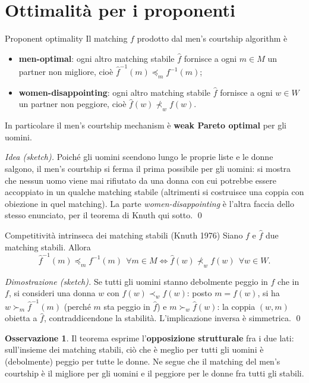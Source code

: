 \documentclass[12pt,a4paper,twoside]{book}
\theoremstyle{plain}
\theoremstyle{definition}
\newtheorem{remark}[theorem]{Osservazione}
\begin{document}
\section{Ottimalità per i proponenti}

\begin{thmbox}{Proponent optimality}
Il matching $f$ prodotto dal men's courtship algorithm è
\begin{itemize}
  \item \textbf{men-optimal}: ogni altro matching stabile $\hat f$ fornisce a ogni $m\in M$ un partner non migliore, cioè $\hat f^{-1}(m)\preceq_m f^{-1}(m)$;
  \item \textbf{women-disappointing}: ogni altro matching stabile $\hat f$ fornisce a ogni $w\in W$ un partner non peggiore, cioè $\hat f(w)\not\prec_w f(w)$.
\end{itemize}
In particolare il men's courtship mechanism è \textbf{weak Pareto optimal} per gli uomini.
\end{thmbox}

\textit{Idea (sketch).} Poiché gli uomini scendono lungo le proprie liste e le donne salgono, il men's courtship si ferma il prima possibile per gli uomini: si mostra che nessun uomo viene mai rifiutato da una donna con cui potrebbe essere accoppiato in un qualche matching stabile (altrimenti si costruisce una coppia con obiezione in quel matching). La parte \emph{women-disappointing} è l'altra faccia dello stesso enunciato, per il teorema di Knuth qui sotto. \qed

\begin{thmbox}{Competitività intrinseca dei matching stabili (Knuth 1976)}
Siano $f$ e $\hat f$ due matching stabili. Allora
\[ \hat f^{-1}(m)\preceq_m f^{-1}(m)\ \ \forall m\in M \iff \hat f(w)\not\prec_w f(w)\ \ \forall w\in W. \]
\end{thmbox}

\textit{Dimostrazione (sketch).} Se tutti gli uomini stanno debolmente peggio in $\hat f$ che in $f$, si consideri una donna $w$ con $\hat f(w)\prec_w f(w)$: posto $m=f(w)$, si ha $w\succ_m \hat f^{-1}(m)$ (perché $m$ sta peggio in $\hat f$) e $m\succ_w \hat f(w)$: la coppia $(w,m)$ obietta a $\hat f$, contraddicendone la stabilità. L'implicazione inversa è simmetrica. \qed

\begin{remark}
Il teorema esprime l'\textbf{opposizione strutturale} fra i due lati: sull'insieme dei matching stabili, ciò che è meglio per tutti gli uomini è (debolmente) peggio per tutte le donne. Ne segue che il matching del men's courtship è il migliore per gli uomini e il peggiore per le donne fra tutti gli stabili.
\end{remark}
\end{document}

